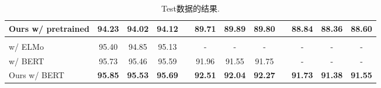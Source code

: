 \begin{table*}[tb]
\begin{tabularx}{\textwidth}{lccccccccccc}
        Ours w/ pretrained                              & \textbf{94.23}           & \textbf{94.02}           & \textbf{94.12}             &  & \textbf{89.71}           & \textbf{89.89}           & \textbf{89.80}           &  & \textbf{88.84} & \textbf{88.36} & \textbf{88.60} \\[1pt]
        \hline
        \\[-8pt]
        \cite{kitaev-klein-2018-constituency} w/ ELMo   & 95.40                    & 94.85                    & 95.13                      &  & -                        & -                        & -                        &  & -              & -              & -              \\
        \cite{kitaev-etal-2019-multilingual} w/ BERT    & 95.73                    & 95.46                    & 95.59                      &  & 91.96                    & 91.55                    & 91.75                    &  & -              & -              & -              \\[3pt]
        Ours w/ BERT                                    & \textbf{95.85}           & \textbf{95.53}           & \textbf{95.69}             &  & \textbf{92.51}           & \textbf{92.04}           & \textbf{92.27}           &  & \textbf{91.73} & \textbf{91.38} & \textbf{91.55} \\
        \bottomrule
    \end{tabularx}
    \caption{Test数据的结果.}
    \label{table:con-test}
\end{table*}

